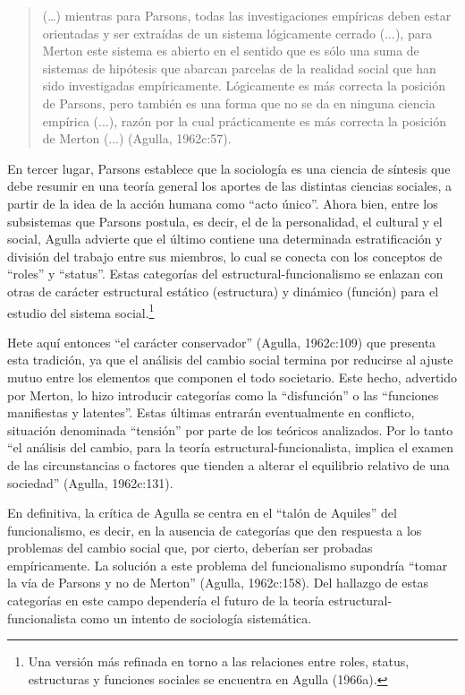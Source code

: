 \begin{quote}
(\ldots) mientras para Parsons, todas las investigaciones empíricas deben estar orientadas y ser extraídas de un sistema lógicamente cerrado (...), para Merton este sistema es abierto en el sentido que es sólo una suma de sistemas de hipótesis que abarcan parcelas de la realidad social que han sido investigadas empíricamente. Lógicamente es más correcta la posición de Parsons, pero también es una forma que no se da en ninguna ciencia empírica (...), razón por la cual prácticamente es más correcta la posición de Merton (...) (Agulla, 1962c:57).
\end{quote}

En tercer lugar, Parsons establece que la sociología es una ciencia de síntesis que debe resumir en una teoría general los aportes de las distintas ciencias sociales, a partir de la idea de la acción humana como ``acto único''. Ahora bien, entre los subsistemas que Parsons postula, es decir, el de la personalidad, el cultural y el social, Agulla advierte que el último contiene una determinada estratificación y división del trabajo entre sus miembros, lo cual se conecta con los conceptos de ``roles'' y ``status''. Estas categorías del estructural-funcionalismo se enlazan con otras de carácter estructural estático (estructura) y dinámico (función) para el estudio del sistema social.\footnote{Una versión más refinada en torno a las relaciones entre roles, status, estructuras y funciones sociales se encuentra en Agulla (1966a).}

Hete aquí entonces ``el carácter conservador'' (Agulla, 1962c:109) que presenta esta tradición, ya que el análisis del cambio social termina por reducirse al ajuste mutuo entre los elementos que componen el todo societario. Este hecho, advertido por Merton, lo hizo introducir categorías como la ``disfunción'' o las ``funciones manifiestas y latentes''. Estas últimas entrarán eventualmente en conflicto, situación denominada ``tensión'' por parte de los teóricos analizados. Por lo tanto ``el análisis del cambio, para la teoría estructural-funcionalista, implica el examen de las circunstancias o factores que tienden a alterar el equilibrio relativo de una sociedad'' (Agulla, 1962c:131).

En definitiva, la crítica de Agulla se centra en el ``talón de Aquiles'' del funcionalismo, es decir, en la ausencia de categorías que den respuesta a los problemas del cambio social que, por cierto, deberían ser probadas empíricamente. La solución a este problema del funcionalismo supondría ``tomar la vía de Parsons y no de Merton'' (Agulla, 1962c:158). Del hallazgo de estas categorías en este campo dependería el futuro de la teoría estructural-funcionalista como un intento de sociología sistemática.

